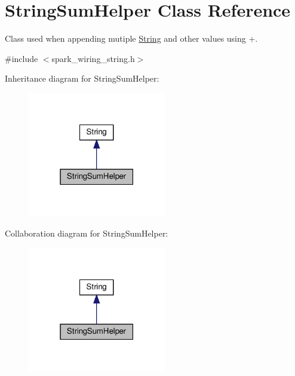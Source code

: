 \hypertarget{class_string_sum_helper}{}\section{String\+Sum\+Helper Class Reference}
\label{class_string_sum_helper}


Class used when appending mutiple \hyperlink{class_string}{String} and other values using +.  




{\ttfamily \#include $<$spark\+\_\+wiring\+\_\+string.\+h$>$}



Inheritance diagram for String\+Sum\+Helper\+:
\nopagebreak
\begin{figure}[H]
\begin{center}
\leavevmode
\includegraphics[width=171pt]{class_string_sum_helper__inherit__graph}
\end{center}
\end{figure}


Collaboration diagram for String\+Sum\+Helper\+:
\nopagebreak
\begin{figure}[H]
\begin{center}
\leavevmode
\includegraphics[width=171pt]{class_string_sum_helper__coll__graph}
\end{center}
\end{figure}
